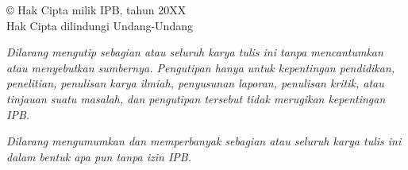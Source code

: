 
\clearpage
\thispagestyle{empty}

\vspace*{\fill}

\begin{center}
{\fontsize{14pt}{17pt}\selectfont
\copyright{} Hak Cipta milik IPB, tahun 20XX\\
Hak Cipta dilindungi Undang-Undang
}
\end{center}

\vspace{\baselineskip}

\textit{Dilarang mengutip sebagian atau seluruh karya tulis ini tanpa
mencantumkan atau menyebutkan sumbernya. Pengutipan hanya untuk kepentingan
pendidikan, penelitian, penulisan karya ilmiah, penyusunan laporan, penulisan
kritik, atau tinjauan suatu masalah, dan pengutipan tersebut tidak merugikan
kepentingan IPB.}

\vspace{\baselineskip}

\textit{Dilarang mengumumkan dan memperbanyak sebagian atau seluruh karya
tulis ini dalam bentuk apa pun tanpa izin IPB.}
